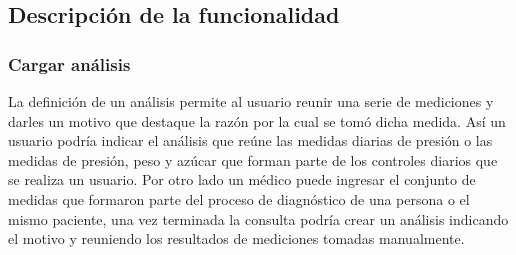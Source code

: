 {\scriptsize
	\begin{center} %
		\centering
	\end{center}
}

\subsection{Descripción de la funcionalidad} %
\subsubsection{Cargar análisis}

 La definición de un análisis permite al usuario reunir una serie de mediciones y darles un motivo que destaque la razón por la cual se tomó dicha medida. Así un usuario podría indicar el análisis que reúne las medidas diarias de presión o las medidas de presión, peso y azúcar que forman parte de los controles diarios que se realiza un usuario. Por otro lado un médico puede ingresar el conjunto de medidas que formaron parte del proceso de diagnóstico de una persona o el mismo paciente, una vez terminada la consulta podría crear un análisis indicando el motivo y reuniendo los resultados de mediciones tomadas manualmente.

